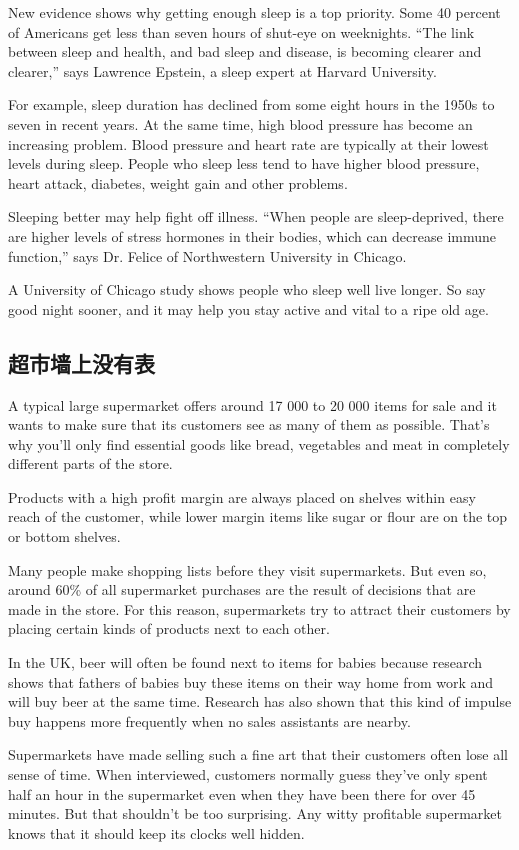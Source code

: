 New evidence shows why getting enough sleep is
a top priority. Some 40 percent of Americans get less than
seven hours of shut-eye on weeknights. “The link between
sleep and health, and bad sleep and disease, is becoming
clearer and clearer,” says Lawrence Epstein, a sleep
expert at Harvard University.

For example, sleep duration has declined from some
eight hours in the 1950s to seven in recent years. At the
same time, high blood pressure has become an increasing
problem. Blood pressure and heart rate are typically at
their lowest levels during sleep. People who sleep less
tend to have higher blood pressure, heart attack, diabetes,
weight gain and other problems.

Sleeping better may help fight off illness. “When
people are sleep-deprived, there are higher levels of
stress hormones in their bodies, which can decrease immune
function,” says Dr. Felice of Northwestern University
in Chicago.

A University of Chicago study shows people who sleep
well live longer. So say good night sooner, and it may help
you stay active and vital to a ripe old age.
\subsection{超市墙上没有表}
A typical large supermarket offers around 17 000 to 20 000
items for sale and it wants to make sure that its customers
see as many of them as possible. That's why you'll
only find essential goods like bread, vegetables and meat
in completely different parts of the store.

Products with a high profit margin are always placed
on shelves within easy reach of the customer, while lower
margin items like sugar or flour are on the top or bottom
shelves.

Many people make shopping lists before they visit
supermarkets. But even so, around 60\% of all supermarket
purchases are the result of decisions that are made in the
store. For this reason, supermarkets try to attract their customers
by placing certain kinds of products next to each
other.

In the UK, beer will often be found next to items for babies
because research shows that fathers of babies buy these
items on their way home from work and will buy beer at
the same time. Research has also shown that this kind of
impulse buy happens more frequently when no sales assistants
are nearby.

Supermarkets have made selling such a fine art that their
customers often lose all sense of time. When interviewed,
customers normally guess they've only spent half an
hour in the supermarket even when they have been there
for over 45 minutes. But that shouldn't be too surprising.
Any witty profitable supermarket knows that it should keep
its clocks well hidden.

